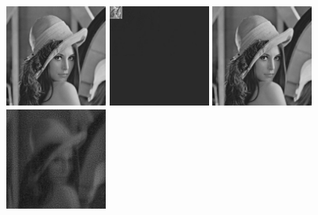 \documentclass{article}
\begin{document}
\includegraphics[width=0.25\textwidth]{../data/lenna.jpg}
\includegraphics[width=0.25\textwidth]{../data/cohen_daubechies_feauveau_transform_lenna.jpg}
\includegraphics[width=0.25\textwidth]{../data/cohen_daubechies_feauveau_lenna.jpg}
\includegraphics[width=0.25\textwidth]{../data/delta_cohen_daubechies_feauveau_lenna.jpg}
\end{document}
